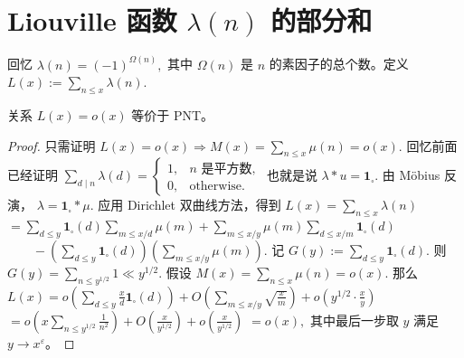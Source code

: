 \section{\texorpdfstring{Liouville 函数 \(\lambda(n)\) 的部分和}{Liouville 函数 lambda(n) 的部分和}}

回忆
\(\textstyle \lambda(n)=\allowbreak{}(-1)^{\Omega(n)},\allowbreak{}\)
其中 $\Omega(n)$ 是 $n$ 的素因子的总个数。定义
\(\textstyle L(x):=\allowbreak{}\sum_{n\leq\allowbreak{} x}\lambda(n).\)

\begin{theorem}[原文 Theorem 3.20]
	关系
	\(\textstyle L(x)=\allowbreak{}o(x)\)
	等价于 PNT。
\end{theorem}

\begin{proof}
	只需证明
	\(\textstyle L(x)=\allowbreak{}o(x)\Longrightarrow\allowbreak{} M(x)=\allowbreak{}\sum_{n\leq\allowbreak{} x}\mu(n)=\allowbreak{}o(x).\)
	回忆前面已经证明
	\(\textstyle \sum_{d\mid n}\lambda(d) = \begin{cases} 1, & n \text{ 是平方数},\\ 0, & \text{otherwise}. \end{cases}\)
	也就是说
	\(\textstyle \lambda*u=\allowbreak{}\mathbf 1_{\square}.\)
	由 Möbius 反演，
	\(\textstyle \lambda=\allowbreak{}\mathbf 1_{\square}*\mu.\)
	应用 Dirichlet 双曲线方法，得到
	\(\textstyle L(x) =\allowbreak{} \sum_{n\leq\allowbreak{} x}\lambda(n)\) \(\textstyle =\allowbreak{} \sum_{d\leq\allowbreak{} y}\mathbf 1_{\square}(d) \sum_{m\leq\allowbreak{} x/d}\mu(m) +\allowbreak{} \sum_{m\leq\allowbreak{} x/y}\mu(m) \sum_{d\leq\allowbreak{} x/m}\mathbf 1_{\square}(d)\) \(\textstyle \qquad - \left(\sum_{d\leq\allowbreak{} y}\mathbf 1_{\square}(d)\right) \left(\sum_{m\leq\allowbreak{} x/y}\mu(m)\right).\)
	记
	\(\textstyle G(y):=\allowbreak{}\sum_{d\leq\allowbreak{} y}\mathbf 1_{\square}(d).\)
	则
	\(\textstyle G(y)=\allowbreak{}\sum_{n\leq\allowbreak{} y^{1/2}}1\ll\allowbreak{} y^{1/2}.\)
	假设
	\(\textstyle M(x)=\allowbreak{}\sum_{n\leq\allowbreak{} x}\mu(n)=\allowbreak{}o(x).\)
	那么
	\(\textstyle L(x) =\allowbreak{} o\left(\sum_{d\leq\allowbreak{} y}\frac{x}{d}\mathbf 1_{\square}(d)\right) +\allowbreak{} O\left(\sum_{m\leq\allowbreak{} x/y}\sqrt{\frac{x}{m}}\right) +\allowbreak{} o\left(y^{1/2}\cdot\frac{x}{y}\right)\) \(\textstyle =\allowbreak{} o\left(x\sum_{n\leq\allowbreak{} y^{1/2}}\frac1{n^2}\right) +\allowbreak{} O\left(\frac{x}{y^{1/2}}\right) +\allowbreak{} o\left(\frac{x}{y^{1/2}}\right)\) \(\textstyle =\allowbreak{}o(x),\allowbreak{}\)
	其中最后一步取 $y$ 满足 $y\to x^\varepsilon$。


\end{proof}
